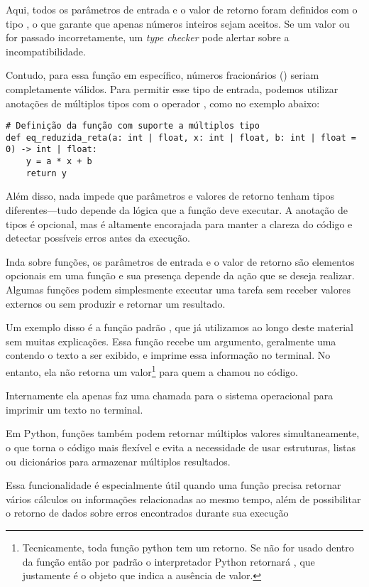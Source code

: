 Aqui, todos os parâmetros de entrada e o valor de retorno foram definidos com o tipo , o que garante que
apenas números inteiros sejam aceitos.
Se um valor  ou  for passado incorretamente, um \textit{type checker} pode alertar sobre a
incompatibilidade.

Contudo, para essa função em específico, números fracionários () seriam completamente válidos.
Para permitir esse tipo de entrada, podemos utilizar anotações de múltiplos tipos com o operador \inlcode{|}, como no
exemplo abaixo:
\begin{verbatim}
# Definição da função com suporte a múltiplos tipo
def eq_reduzida_reta(a: int | float, x: int | float, b: int | float = 0) -> int | float:
    y = a * x + b
    return y
\end{verbatim}

Além disso, nada impede que parâmetros e valores de retorno tenham tipos diferentes—tudo depende da lógica que a
função deve executar.
A anotação de tipos é opcional, mas é altamente encorajada para manter a clareza do código e detectar possíveis erros
antes da execução.

Inda sobre funções, os parâmetros de entrada e o valor de retorno são elementos opcionais em uma função e sua presença
depende da ação que se deseja realizar.
Algumas funções podem simplesmente executar uma tarefa sem receber valores externos ou sem produzir e retornar um
resultado.

Um exemplo disso é a função padrão , que já utilizamos ao longo deste material sem muitas explicações.
Essa função recebe um argumento, geralmente uma  contendo o texto a ser exibido, e imprime essa informação
no terminal.
No entanto, ela não retorna um valor\footnote{Tecnicamente, toda função python tem um retorno. Se  não for usado dentro da função então por padrão o interpretador Python retornará , que justamente é o objeto que indica a ausência de valor.} para quem a chamou no código.

Internamente ela apenas faz uma chamada para o sistema operacional para imprimir um texto no terminal.

Em Python, funções também podem retornar múltiplos valores simultaneamente, o que torna o código mais flexível e evita
a necessidade de usar estruturas, listas ou dicionários para armazenar múltiplos resultados.

Essa funcionalidade é especialmente útil quando uma função precisa retornar vários cálculos ou informações
relacionadas ao mesmo tempo, além de possibilitar o retorno de dados sobre erros encontrados durante sua execução

